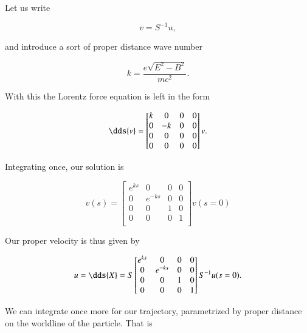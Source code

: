 {Let us write

\begin{equation}\label{eqn:relElectroDynProblemSet2:790}
v = S^{-1} u,
\end{equation}

and introduce a sort of proper distance wave number

\begin{equation}\label{eqn:relElectroDynProblemSet2:810}
k = \frac{e \sqrt{E^2 - B^2}}{m c^2}.
\end{equation}

With this the Lorentz force equation is left in the form

\begin{equation}\label{eqn:relElectroDynProblemSet2:830}
\dds{v} =
\begin{bmatrix}
k & 0 & 0 & 0 \\
0 & -k & 0 & 0 \\
0 & 0 & 0 & 0 \\
0 & 0 & 0 & 0 \\
\end{bmatrix} v.
\end{equation}

Integrating once, our solution is

\begin{equation}\label{eqn:relElectroDynProblemSet2:850}
v(s) =
\begin{bmatrix}
e^{ks} & 0 & 0 & 0 \\
0 & e^{-ks} & 0 & 0 \\
0 & 0 & 1 & 0 \\
0 & 0 & 0 & 1 \\
\end{bmatrix} v(s=0)
\end{equation}

Our proper velocity is thus given by

\begin{equation}\label{eqn:relElectroDynProblemSet2:870}
u = \dds{X} = S
\begin{bmatrix}
e^{ks} & 0 & 0 & 0 \\
0 & e^{-ks} & 0 & 0 \\
0 & 0 & 1 & 0 \\
0 & 0 & 0 & 1 \\
\end{bmatrix} S^{-1} u(s=0).
\end{equation}

We can integrate once more for our trajectory, parametrized by proper distance on the worldline of the particle.  That is

}
